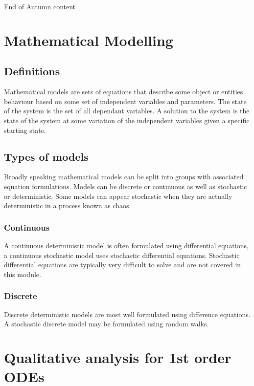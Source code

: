 \documentclass[12pt]{article}
\begin{document}
\hrulefill
\begin{center}
End of Autumn content
\end{center}
\hrulefill
\section{Mathematical Modelling}
\subsection*{Definitions}
Mathematical models are sets of equations that describe some object or entities behaviour based on some set of independent variables and parameters. The state of the system is the set of all dependant variables. A solution to the system is the state of the system at some variation of the independent variables given a specific starting state.
\subsection*{Types of models}
Broadly speaking mathematical models can be split into groups with associated equation formulations. Models can be discrete or continuous as well as stochastic or deterministic. Some models can appear stochastic when they are actually deterministic in a process known as chaos.
\subsubsection*{Continuous}
A continuous deterministic model is often formulated using differential equations, a continuous stochastic model uses stochastic differential equations. Stochastic differential equations are typically very difficult to solve and are not covered in this module.
\subsubsection*{Discrete}
Discrete deterministic models are most well formulated using difference equations. A stochastic discrete model may be formulated using random walks.
\section{Qualitative analysis for 1st order ODEs}
\end{document}
